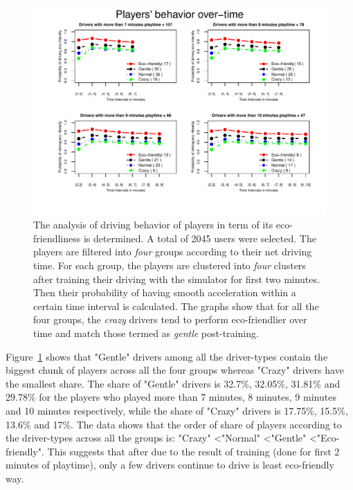 \documentclass[preprint,authoryear,12pt]{elsarticle}
\begin{document}
\begin{figure}[!htb]
	\centering
	\includegraphics[width=0.95\linewidth]{ijhcs14-img/Evolution.pdf}
	\caption{The analysis of driving behavior of players in term of its eco-friendliness is determined. A total of 2045 users were selected. The players are filtered into \textit{four} groups according to their net driving time. For each group, the players are clustered into \textit{four} clusters after training their driving with the simulator for first two minutes. Then their probability of having smooth acceleration within a certain time interval is calculated. The graphs show that for all the four groups, the \emph{crazy} drivers tend to perform eco-friendlier over time and match those termed as \textit{gentle} post-training.
	}
	\label{fig:evolution}
\end{figure}

Figure~\ref{fig:evolution} shows that "Gentle" drivers among all the driver-types contain the biggest chunk of players across all the four groups whereas "Crazy" drivers have the smallest share. The share of "Gentle" drivers is 32.7\%, 32.05\%, 31.81\% and 29.78\% for the players who played more than 7 minutes, 8 minutes, 9 minutes and 10 minutes respectively, while the share of "Crazy" drivers is 17.75\%, 15.5\%, 13.6\% and 17\%. The data shows that the order of share of players according to the driver-types across all the groups is:  "Crazy" \textless "Normal" \textless "Gentle" \textless "Eco-friendly". This suggests that after due to the result of training (done for first 2 minutes of playtime), only a few drivers continue to drive is least eco-friendly way.
\end{document}
